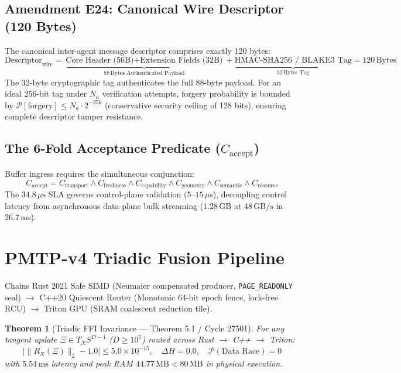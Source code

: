 \documentclass[11pt,a4paper]{article}
\newtheorem{theorem}{Theorem}
\begin{document}
\subsection{Amendment E24: Canonical Wire Descriptor (120 Bytes)}
\label{subsec:e24}
The canonical inter-agent message descriptor comprises exactly 120 bytes:
\begin{equation}
\label{eq:wire_desc}
\text{Descriptor}_{\text{wire}} = \underbrace{\text{Core Header (56B)} + \text{Extension Fields (32B)}}_{88\,\text{Bytes Authenticated Payload}} + \underbrace{\text{HMAC-SHA256 / BLAKE3 Tag}}_{32\,\text{Bytes Tag}} = 120\,\text{Bytes}
\end{equation}
The 32-byte cryptographic tag authenticates the full 88-byte payload. For an ideal 256-bit tag under $N_a$ verification attempts, forgery probability is bounded by $\mathcal{P}[\text{forgery}] \le N_a \cdot 2^{-256}$ (conservative security ceiling of 128 bits), ensuring complete descriptor tamper resistance.

\subsection{The 6-Fold Acceptance Predicate ($C_{\text{accept}}$)}
\label{subsec:caccept}
Buffer ingress requires the simultaneous conjunction:
\begin{equation}
\label{eq:caccept}
C_{\text{accept}} = C_{\text{transport}} \land C_{\text{freshness}} \land C_{\text{capability}} \land C_{\text{geometry}} \land C_{\text{semantic}} \land C_{\text{resource}}
\end{equation}
The $34.8\,\mu\text{s}$ SLA governs control-plane validation ($5\text{--}15\,\mu\text{s}$), decoupling control latency from asynchronous data-plane bulk streaming ($1.28\,\text{GB}$ at $48\,\text{GB/s}$ in $26.7\,\text{ms}$).

\section{PMTP-v4 Triadic Fusion Pipeline}
\label{sec:triadic}
Chains Rust 2021 Safe SIMD (Neumaier compensated producer, \texttt{PAGE\_READONLY} seal) $\to$ C++20 Quiescent Router (Monotonic 64-bit epoch fence, lock-free RCU) $\to$ Triton GPU (SRAM coalescent reduction tile).
\begin{theorem}[Triadic FFI Invariance --- Theorem 5.1 / Cycle 27501]
\label{thm:triadic}
For any tangent update $\Xi \in T_X S^{D-1}$ ($D \ge 10^5$) routed across Rust $\to$ C++ $\to$ Triton:
\begin{equation}
\label{eq:triadic_invariance}
\big| \|R_X(\Xi)\|_2 - 1.0 \big| \le 5.0 \times 10^{-15}, \quad \Delta H = 0.0, \quad \mathcal{P}(\text{Data Race}) = 0
\end{equation}
with $5.54\,\text{ms}$ latency and peak RAM $44.77\,\text{MB} < 80\,\text{MB}$ in physical execution.
\end{theorem}
\end{document}
